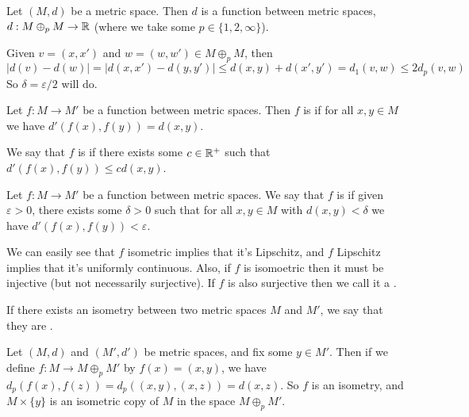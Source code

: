 \documentclass[a4paper]{scrartcl}
\begin{document}
\begin{example}
    Let $(M, d)$ be a metric space. Then $d$ is a function between metric spaces, $d: M \oplus_p M \rightarrow \mathbb{R}$ (where we take some $p \in \{1, 2, \infty\}$).

    Given $v = (x, x')$ and $w = (w, w') \in M \oplus_p M$, then 
    $$|d(v) - d(w)| = |d(x, x') - d(y, y')| \leq d(x, y) + d(x', y') = d_1(v, w) \leq 2d_p(v, w)$$
    So $\delta = \varepsilon/2$ will do.
\end{example}

\begin{definition}
    Let $f: M \rightarrow M'$ be a function between metric spaces. Then $f$ is  if for all $x, y \in M$ we have $d'(f(x), f(y)) = d(x, y)$.

    We say that $f$ is  if there exists some $c \in \mathbb{R}^+$ such that $d'(f(x), f(y)) \leq cd(x, y)$.
\end{definition}

\begin{definition}
    Let $f: M \rightarrow M'$ be a function between metric spaces. We say that $f$ is  if given $\varepsilon > 0$, there exists some $\delta > 0$ such that for all $x, y \in M$ with $d(x, y) < \delta$ we have $d'(f(x), f(y)) < \varepsilon$. 
\end{definition}

We can easily see that $f$ isometric implies that it's Lipschitz, and $f$ Lipschitz implies that it's uniformly continuous. Also, if $f$ is isomoetric then it must be injective (but not necessarily surjective). If $f$ is also surjective then we call it a .

If there exists an isometry between two metric spaces $M$ and $M'$, we say that they are .

\begin{example}
    Let $(M,d)$ and $(M', d')$ be metric spaces, and fix some $y \in M'$. Then if we define $f: M \rightarrow M \oplus_p M'$ by $f(x) = (x, y)$, we have $d_p(f(x), f(z)) = d_p((x, y), (x, z)) = d(x, z)$. So $f$ is an isometry, and $M \times \{y\}$ is an isometric copy of $M$ in the space $M \oplus_p M'$. 
\end{example}
\end{document}
